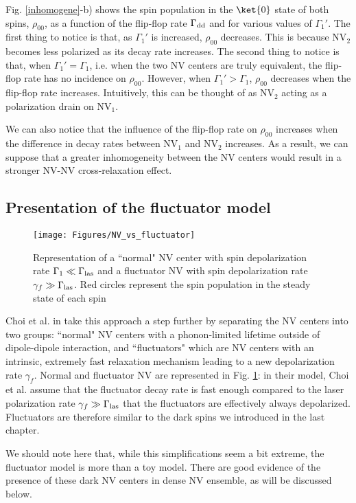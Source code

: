 \documentclass[a4paper,11pt]{report}
\begin{document}
Fig. \ref{inhomogene}-b) shows the spin population in the $\ket{0}$ state of both spins, $\rho_{00}$, as a function of the flip-flop rate $\Gamma_{\rm dd}$ and for various values of $\Gamma_1'$. The first thing to notice is that, as $\Gamma_1'$ is increased,  $\rho_{00}$ decreases. This is because NV$_2$ becomes less polarized as its decay rate increases. The second thing to notice is that, when $\Gamma_1'=\Gamma_1$, i.e. when the two NV centers are truly equivalent, the flip-flop rate has no incidence on  $\rho_{00}$. However, when $\Gamma_1'>\Gamma_1$,  $\rho_{00}$ decreases when the flip-flop rate increases. Intuitively, this can be thought of as NV$_2$ acting as a polarization drain on NV$_1$. 

We can also notice that the influence of the flip-flop rate on $\rho_{00}$ increases when the difference in decay rates between NV$_1$ and NV$_2$ increases. As a result, we can suppose that a greater inhomogeneity between the NV centers would result in a stronger NV-NV cross-relaxation effect.


\subsection{Presentation of the fluctuator model}
\begin{figure}[h]
\centering
\texttt{[image: Figures/NV\_vs\_fluctuator]}
\caption{Representation of a ``normal" NV center with spin depolarization rate $\Gamma_1 \ll \Gamma_{\rm las}$ and a fluctuator NV with spin depolarization rate $\gamma_f \gg \Gamma_{\rm las}$. Red circles represent the spin population in the steady state of each spin}
\label{NV vs fluct}
\end{figure}
Choi et al. in \citep{choi2017depolarization} take this approach a step further by separating the NV centers into two groups: ``normal" NV centers with a phonon-limited lifetime outside of dipole-dipole interaction, and ``fluctuators" which are NV centers with an intrinsic, extremely fast relaxation mechanism leading to a new depolarization rate $\gamma_f$. Normal and fluctuator NV are represented in Fig. \ref{NV vs fluct}: in their model, Choi et al. assume that the fluctuator decay rate is fast enough compared to the laser polarization rate $\gamma_f \gg \Gamma_{\rm las}$ that the fluctuators are effectively always depolarized. Fluctuators are therefore similar to the dark spins we introduced in the last chapter.

We should note here that, while this simplifications seem a bit extreme, the fluctuator model is more than a toy model. There are good evidence of the presence of these dark NV centers in dense NV ensemble, as will be discussed below.
\end{document}
